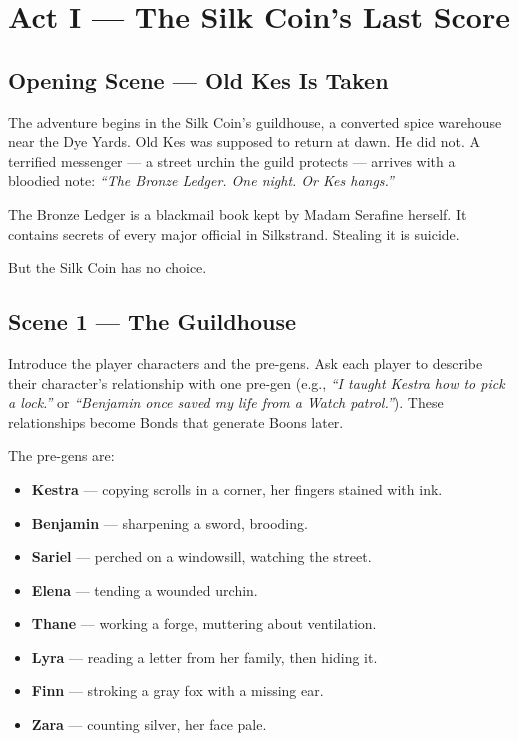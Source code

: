 \documentclass[10pt,twoside]{book}
\begin{document}
\chapter{Act I --- The Silk Coin's Last Score}

\section{Opening Scene --- Old Kes Is Taken}

The adventure begins in the Silk Coin's guildhouse, a converted spice warehouse near the Dye Yards. Old Kes was supposed to return at dawn. He did not. A terrified messenger --- a street urchin the guild protects --- arrives with a bloodied note: \textit{``The Bronze Ledger. One night. Or Kes hangs.''}

The Bronze Ledger is a blackmail book kept by Madam Serafine herself. It contains secrets of every major official in Silkstrand. Stealing it is suicide.

But the Silk Coin has no choice.

\section{Scene 1 --- The Guildhouse}

Introduce the player characters and the pre-gens. Ask each player to describe their character's relationship with one pre-gen (e.g., \textit{``I taught Kestra how to pick a lock.''} or \textit{``Benjamin once saved my life from a Watch patrol.''}). These relationships become Bonds that generate Boons later.

The pre-gens are:
\begin{itemize}
\item \textbf{Kestra} --- copying scrolls in a corner, her fingers stained with ink.
\item \textbf{Benjamin} --- sharpening a sword, brooding.
\item \textbf{Sariel} --- perched on a windowsill, watching the street.
\item \textbf{Elena} --- tending a wounded urchin.
\item \textbf{Thane} --- working a forge, muttering about ventilation.
\item \textbf{Lyra} --- reading a letter from her family, then hiding it.
\item \textbf{Finn} --- stroking a gray fox with a missing ear.
\item \textbf{Zara} --- counting silver, her face pale.
\end{itemize}
\end{document}

